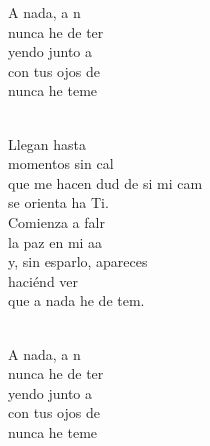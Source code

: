 \documentclass[12pt]{article}
\begin{document}
\begin{multicols*}{2}
\begin{cancion}
	\begin{chorus}%
	A nada, a n  \\
	nunca he de ter\\
	yendo junto a \\
	con tus ojos de \\
	nunca he  teme\\
	\end{chorus}%
	\jump\\
	Llegan hasta   \\
	momentos sin cal  \\
	que me hacen dud de si mi cam\\
	se orienta ha Ti.\\
	Comienza a falr \\
	la paz en mi aa \\
	y, sin esparlo, apareces \\
	haciénd ver\\
	que a nada he de tem.\\\jump\\
	\begin{chorus}%
	A nada, a n  \\
	nunca he de ter\\
	yendo junto a \\
	con tus ojos de \\
	nunca he  teme\\
	\end{chorus}%
	\jump\\
\end{cancion}%


\end{multicols*}
\end{document}
